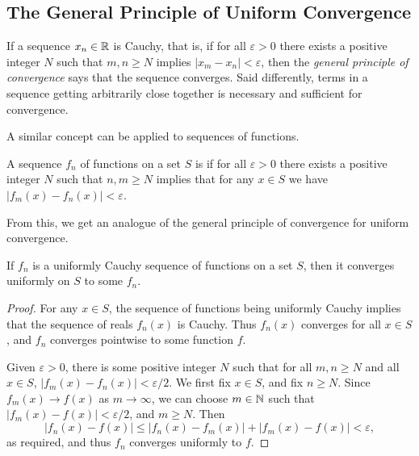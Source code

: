 \documentclass[a4paper]{scrartcl}
\begin{document}
\subsection{The General Principle of Uniform Convergence}

If a sequence $x_n \in \mathbb{R}$ is Cauchy, that is, if for all $\varepsilon > 0$ there exists a positive integer $N$ such that $m, n \geq N$ implies $|x_m - x_n| < \varepsilon$, then the \emph{general principle of convergence} says that the sequence converges.
Said differently, terms in a sequence getting arbitrarily close together is necessary and sufficient for convergence. 

A similar concept can be applied to sequences of functions.

\begin{definition}
    A sequence $f_n$ of functions on a set $S$ is  if for all $\varepsilon > 0$ there exists a positive integer $N$ such that $n, m \geq N$ implies that for any $x \in S$ we have $|f_m(x) - f_n(x)| < \varepsilon$.
\end{definition}

From this, we get an analogue of the general principle of convergence for uniform convergence.

\begin{theorem}
    If $f_n$ is a uniformly Cauchy sequence of functions on a set $S$, then it converges uniformly on $S$ to some $f_n$.
\end{theorem}
\begin{proof}
    For any $x \in S$, the sequence of functions being uniformly Cauchy implies that the sequence of reals $f_n(x)$ is Cauchy. Thus $f_n(x)$ converges for all $x \in S$, and $f_n$ converges pointwise to some function $f$. 

    Given $\varepsilon > 0$, there is some positive integer $N$ such that for all $m, n \geq N$ and all $x \in S$, $|f_m(x) - f_n(x)| < \varepsilon/2$. We first fix $x \in S$, and fix $n \geq N$. Since $f_m(x) \rightarrow f(x)$ as $m \rightarrow \infty$, we can choose $m \in \mathbb{N}$ such that $|f_m(x) - f(x)| < \varepsilon/2$, and $m \geq N$. Then
    $$
    |f_n(x) - f(x)| \leq |f_n(x) - f_m(x)| + |f_m(x) - f(x)| < \varepsilon,
    $$
    as required, and thus $f_n$ converges uniformly to $f$.
\end{proof}

\end{document}
